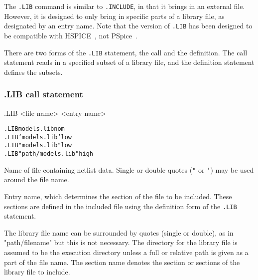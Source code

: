 


The \texttt{.LIB} command is similar to \texttt{.INCLUDE}, in that it
brings in an external file.  However, it is
designed to only bring in specific parts of a library file, as designated
by an entry name.
Note that the \Xyce{} version of \texttt{.LIB} has been designed to be compatible
with HSPICE~\cite{Hspice}, not PSpice~\cite{Pspice}.

There are two forms of the \texttt{.LIB} statement, the call and the
definition.  The call statement reads in a specified subset of a
library file, and the definition statement defines the subsets.

\subsubsection{.LIB call statement}
\begin{Command}
\format
.LIB <file name> <entry name>

\examples
\begin{alltt}
.LIB models.lib nom
.LIB 'models.lib'  low
.LIB "models.lib"  low
.LIB "path/models.lib"  high
\end{alltt}

\arguments

\begin{Arguments}

Name of file containing netlist data.  Single or double quotes
(\texttt{"} or \texttt{'}) may be used around the file name.

Entry name, which determines the section of the file to be included.
These sections are defined in the included file using the definition
form of the \texttt{.LIB} statement.

\end{Arguments}
\end{Command}

The library file name can be surrounded by quotes (single or double),
as in "path/filename" but this is not necessary.  The directory for
the library file is assumed to be the execution directory unless a
full or relative path is given as a part of the file name.  The
section name denotes the section or sections of the library file to
include.

